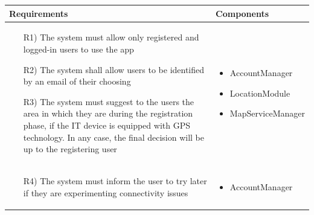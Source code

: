 \documentclass[table, 12pt]{article}
\begin{document}
\begin{longtable}{|p{}|p{}|}
    \hline
    \textbf{Requirements} & \textbf{Components} \\\hline\hline
    \begin{itemize}
        \item[R1)] The system must allow only registered and logged-in users to use the app
        \item[R2)] The system shall allow users to be identified by an email of their choosing
        \item[R3)] The system must suggest to the users the area in which they are during the registration phase, if the IT device is equipped with GPS technology. In any case, the final decision will be up to the registering user
    \end{itemize}
    & 
    \begin{itemize}
        \item AccountManager
        \item LocationModule
        \item MapServiceManager
    \end{itemize}
    \\\hline

    \begin{itemize}
        \item[R4)] The system must inform the user to try later if they are experimenting connectivity issues
    \end{itemize}
    & 
    \begin{itemize}
        \item AccountManager
    \end{itemize}
    \\\hline


\end{longtable}
\end{document}
